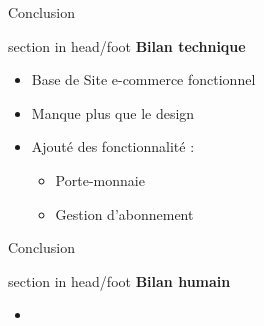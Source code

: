 \documentclass{beamer}
\begin{document}
\begin{frame}{Conclusion}
  	\begin{beamercolorbox}[wd=\paperwidth,ht=1.5em,dp=0.5em,leftskip=0.5cm]{section in head/foot}
  		\large \textbf{Bilan technique}
	\end{beamercolorbox}
	\vspace{0.5em}
	\begin{center}
  		\begin{minipage}{0.9\textwidth}
  			\begin{itemize}
  				\item Base de Site e-commerce fonctionnel
			  	\item Manque plus que le design
			  	\item Ajouté des fonctionnalité : 
			  	\begin{itemize}
			  		\item Porte-monnaie
			  		\item Gestion d'abonnement
			  	\end{itemize}
			\end{itemize}
  		\end{minipage}
	\end{center}
	\vfill
\end{frame}

\begin{frame}{Conclusion}
  	\begin{beamercolorbox}[wd=\paperwidth,ht=1.5em,dp=0.5em,leftskip=0.5cm]{section in head/foot}
  		\large \textbf{Bilan humain}
	\end{beamercolorbox}
	\vspace{0.5em}
	\begin{center}
  		\begin{minipage}{0.9\textwidth}
  			\begin{itemize}
  				\item
  			\end{itemize}
  		\end{minipage}
	\end{center}
	\vfill
\end{frame}
\end{document}
